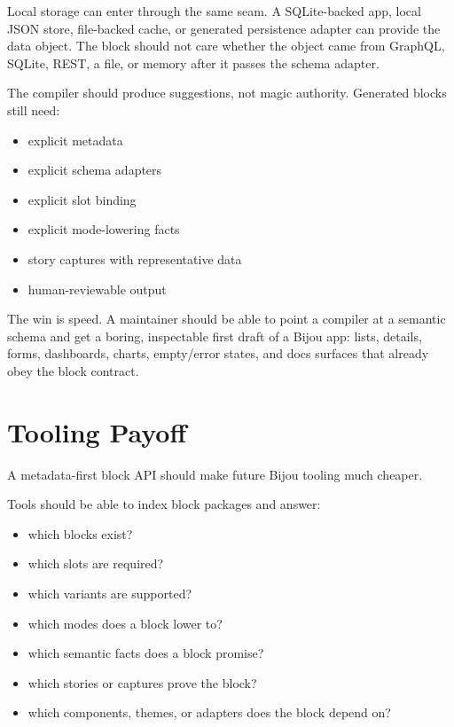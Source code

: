 Local storage can enter through the same seam. A SQLite-backed app, local JSON store, file-backed cache, or generated persistence adapter can provide the data object. The block should not care whether the object came from GraphQL, SQLite, REST, a file, or memory after it passes the schema adapter.

The compiler should produce suggestions, not magic authority. Generated blocks still need:

\begin{itemize}
\tightlist
\item
  explicit metadata
\item
  explicit schema adapters
\item
  explicit slot binding
\item
  explicit mode-lowering facts
\item
  story captures with representative data
\item
  human-reviewable output
\end{itemize}

The win is speed. A maintainer should be able to point a compiler at a semantic schema and get a boring, inspectable first draft of a Bijou app: lists, details, forms, dashboards, charts, empty/error states, and docs surfaces that already obey the block contract.

\section{Tooling Payoff}\label{record-128-tooling-payoff}

A metadata-first block API should make future Bijou tooling much cheaper.

Tools should be able to index block packages and answer:

\begin{itemize}
\tightlist
\item
  which blocks exist?
\item
  which slots are required?
\item
  which variants are supported?
\item
  which modes does a block lower to?
\item
  which semantic facts does a block promise?
\item
  which stories or captures prove the block?
\item
  which components, themes, or adapters does the block depend on?
\end{itemize}

